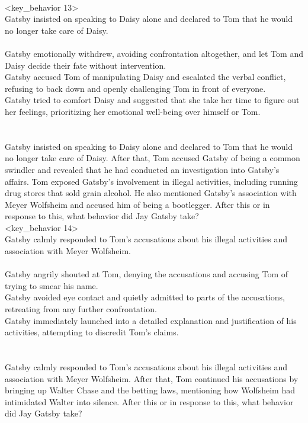 \begin{tcolorbox}[title = {Behavior Chain}, breakable]
\\<key\_behavior 13>\\
Gatsby insisted on speaking to Daisy alone and declared to Tom that he would no longer take care of Daisy.
\\<distracters 13>\\
Gatsby emotionally withdrew, avoiding confrontation altogether, and let Tom and Daisy decide their fate without intervention.\\
Gatsby accused Tom of manipulating Daisy and escalated the verbal conflict, refusing to back down and openly challenging Tom in front of everyone.\\
Gatsby tried to comfort Daisy and suggested that she take her time to figure out her feelings, prioritizing her emotional well-being over himself or Tom.\\
\\<context 14>\\
Gatsby insisted on speaking to Daisy alone and declared to Tom that he would no longer take care of Daisy. After that, Tom accused Gatsby of being a common swindler and revealed that he had conducted an investigation into Gatsby's affairs. Tom exposed Gatsby's involvement in illegal activities, including running drug stores that sold grain alcohol. He also mentioned Gatsby's association with Meyer Wolfsheim and accused him of being a bootlegger. After this or in response to this, what behavior did Jay Gatsby take?
\\<key\_behavior 14>\\
Gatsby calmly responded to Tom's accusations about his illegal activities and association with Meyer Wolfsheim.
\\<distracters 14>\\
Gatsby angrily shouted at Tom, denying the accusations and accusing Tom of trying to smear his name.\\
Gatsby avoided eye contact and quietly admitted to parts of the accusations, retreating from any further confrontation.\\
Gatsby immediately launched into a detailed explanation and justification of his activities, attempting to discredit Tom's claims.\\
\\<context 15>\\
Gatsby calmly responded to Tom's accusations about his illegal activities and association with Meyer Wolfsheim. After that, Tom continued his accusations by bringing up Walter Chase and the betting laws, mentioning how Wolfsheim had intimidated Walter into silence. After this or in response to this, what behavior did Jay Gatsby take?

\end{tcolorbox}

